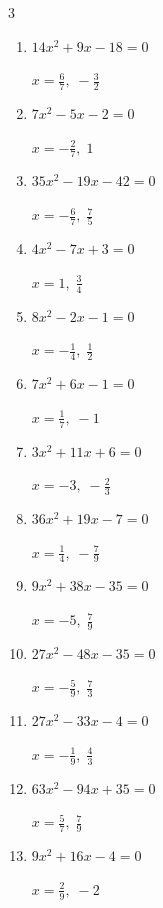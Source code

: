 \begin{multicols}{3}
\begin{enumerate}
  \item $14x^{2}+9x-18=0$

        $\displaystyle x=\frac{6}{7},\; -\frac{3}{2}$

  \item $7x^{2}-5x-2=0$

        $\displaystyle x=-\frac{2}{7},\; 1$

  \item $35x^{2}-19x-42=0$

        $\displaystyle x=-\frac{6}{7},\; \frac{7}{5}$

  \item $4x^{2}-7x+3=0$

        $\displaystyle x=1,\; \frac{3}{4}$

  \item $8x^{2}-2x-1=0$

        $\displaystyle x=-\frac{1}{4},\; \frac{1}{2}$

  \item $7x^{2}+6x-1=0$

        $\displaystyle x=\frac{1}{7},\; -1$

  \item $3x^{2}+11x+6=0$

        $\displaystyle x=-3,\; -\frac{2}{3}$

  \item $36x^{2}+19x-7=0$

        $\displaystyle x=\frac{1}{4},\; -\frac{7}{9}$

  \item $9x^{2}+38x-35=0$

        $\displaystyle x=-5,\; \frac{7}{9}$

  \item $27x^{2}-48x-35=0$

        $\displaystyle x=-\frac{5}{9},\; \frac{7}{3}$

\columnbreak %

  \item $27x^{2}-33x-4=0$

        $\displaystyle x=-\frac{1}{9},\; \frac{4}{3}$

  \item $63x^{2}-94x+35=0$

        $\displaystyle x=\frac{5}{7},\; \frac{7}{9}$

  \item $9x^{2}+16x-4=0$

        $\displaystyle x=\frac{2}{9},\; -2$


\end{enumerate}
\end{multicols}

